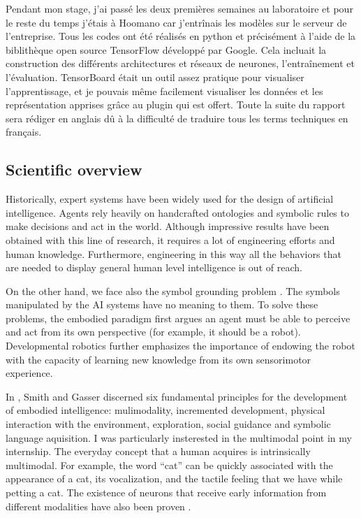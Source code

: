 Pendant mon stage, j'ai passé les deux premières semaines au
laboratoire et pour le reste du temps j'étais à Hoomano car j'entrînais
les modèles sur le serveur de l'entreprise. Tous les codes ont été
réalisés en python et précisément à l'aide de la biblithèque open source
TensorFlow développé par Google. Cela incluait la construction des
différents architectures et réseaux de neurones, l'entraînement et
l'évaluation.
TensorBoard était un outil assez pratique pour visualiser l'apprentissage,
et je pouvais même facilement visualiser les données et les
représentation apprises grâce au plugin qui est offert.
Toute la suite du rapport sera rédiger en anglais dû à la difficulté
de traduire tous les terms techniques en français.

\subsection{Scientific overview}

Historically, expert systems have been widely used for the design
of artificial intelligence. 
Agents rely heavily on handcrafted ontologies and symbolic rules to
make decisions and act in the world.
Although impressive results have been obtained with this line of
research, it requires a lot of engineering efforts and human knowledge.
Furthermore, engineering in this way all the behaviors that are needed
to display general human level intelligence is out of reach.

On the other hand, we face also the symbol grounding problem
\cite{S. Harnad 1990}. The symbols manipulated by the AI systems have
no meaning to them. To solve these problems, the embodied paradigm
\cite{A. Clark 1997} first argues an agent must be able to perceive and
act from its own perspective (for example, it should be a robot).
Developmental robotics \cite{J. Weng 2001} further emphasizes the
importance of endowing the robot with the capacity of learning new
knowledge from its own sensorimotor experience.

In \cite{L. Smith 2005}, Smith and Gasser discerned six fundamental
principles for the development of embodied intelligence: mulimodality,
incremented development, physical interaction with the environment,
exploration, social guidance and symbolic language aquisition.
I was particularly insterested in the multimodal point in my internship.
The everyday concept that a human acquires is intrinsically multimodal.
For example, the word ``cat'' can be quickly associated with the
appearance of a cat, its vocalization, and the tactile feeling that
we have while petting a cat. The existence of neurons that receive
early information from different modalities have also been proven
\cite{S. Molholm 2002}.

